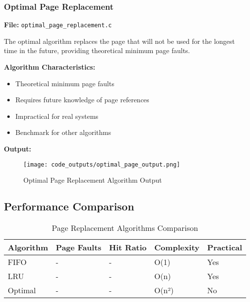 \documentclass[12pt,a4paper]{article}
\begin{document}
\vspace{3cm}

\subsubsection{Optimal Page Replacement}
\textbf{File:} \texttt{optimal\_page\_replacement.c}

The optimal algorithm replaces the page that will not be used for the longest time in the future, providing theoretical minimum page faults.

\textbf{Algorithm Characteristics:}
\begin{itemize}
    \item Theoretical minimum page faults
    \item Requires future knowledge of page references
    \item Impractical for real systems
    \item Benchmark for other algorithms
\end{itemize}

\textbf{Output:}
\begin{figure}[H]
    \centering
    \texttt{[image: code\_outputs/optimal\_page\_output.png]}
    \caption{Optimal Page Replacement Algorithm Output}
    \label{fig:optimal_page_output}
\end{figure}

\vspace{3cm}

\subsection{Performance Comparison}

\begin{table}[H]
\centering
\caption{Page Replacement Algorithms Comparison}
\begin{tabular}{|l|l|l|l|l|}
\hline
\textbf{Algorithm} & \textbf{Page Faults} & \textbf{Hit Ratio} & \textbf{Complexity} & \textbf{Practical} \\
\hline
FIFO & - & - & O(1) & Yes \\
\hline
LRU & - & - & O(n) & Yes \\
\hline
Optimal & - & - & O(n²) & No \\
\hline
\end{tabular}
\label{tab:page_replacement_comparison}
\end{table}
\end{document}
